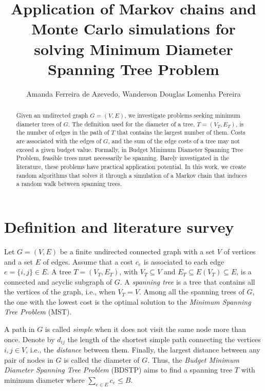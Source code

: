 \documentclass[12pt]{article}
\title{Application of Markov chains and Monte Carlo simulations for solving Minimum Diameter Spanning Tree Problem}
\author{Amanda Ferreira de Azevedo\inst{1}, Wanderson Douglas Lomenha Pereira\inst{1}}
\begin{document}
 

\maketitle

\begin{abstract}
        Given an undirected graph $G=(V,E)$, we investigate problems seeking minimum diameter trees of $G$. The definition used for the diameter of a tree, $T = (V_T , E_T)$, is the number of edges in the path of $T$ that contains the largest number of them. Costs are associated with the edges of $G$, and the sum of the edge costs of a tree may not exceed a given budget value. Formally, in Budget Minimum Diameter Spanning Tree Problem, feasible trees must necessarily be spanning. Barely investigated in the literature, these problems have practical application potential. In this work, we create random algorithms that solves it through a simulation of a Markov chain that induces a random walk between spanning trees.
\end{abstract}
%     

\section{Definition and literature survey}
Let $G = (V, E)$ be a finite undirected connected graph with a set $V$ of vertices and a set $E$ of edges. Assume that a cost $c_{e}$ is associated to each edge $e = \{i, j\} \in E$. A tree $T = (V_T, E_T)$, with $ V_T \subseteq V $ and $E_T \subseteq E(V_T) \subseteq E$, is a connected and acyclic subgraph of $G$. A \textit{spanning tree} is a tree that contains all the vertices of the graph, i.e., when $V_T = V$. Among all the spanning trees of $G$, the one with the lowest cost is the optimal solution to the \textit{Minimum Spanning Tree Problem} (MST).

A path in $G$ is called \textit{simple} when it does not visit the same node more than once. Denote by $d_{ij}$ the length of the shortest simple path connecting the vertices $i,j \in V$, i.e., the \textit{distance} between them. Finally, the largest distance between any pair of nodes in $G$ is called the diameter of $G$. Thus, the \textit{Budget Minimum Diameter Spanning Tree Problem} (BDSTP) aims to find a spanning tree $T$ with minimum diameter where $\displaystyle\sum_{e\in E} c_e \leq B$. 
\end{document}
